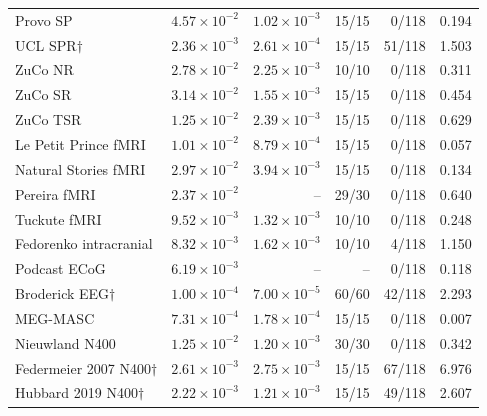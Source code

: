 {\begin{longtable}{@{}lrrrrr@{}}
Provo SP & $4.57\times10^{-2}$ & $1.02\times10^{-3}$ & 15/15 & 0/118 & 0.194 \\
UCL SPR$\dagger$ & $2.36\times10^{-3}$ & $2.61\times10^{-4}$ & 15/15 & 51/118 & 1.503 \\
ZuCo NR & $2.78\times10^{-2}$ & $2.25\times10^{-3}$ & 10/10 & 0/118 & 0.311 \\
ZuCo SR & $3.14\times10^{-2}$ & $1.55\times10^{-3}$ & 15/15 & 0/118 & 0.454 \\
ZuCo TSR & $1.25\times10^{-2}$ & $2.39\times10^{-3}$ & 15/15 & 0/118 & 0.629 \\
Le Petit Prince fMRI & $1.01\times10^{-2}$ & $8.79\times10^{-4}$ & 15/15 & 0/118 & 0.057 \\
Natural Stories fMRI & $2.97\times10^{-2}$ & $3.94\times10^{-3}$ & 15/15 & 0/118 & 0.134 \\
Pereira fMRI & $2.37\times10^{-2}$ & -- & 29/30 & 0/118 & 0.640 \\
Tuckute fMRI & $9.52\times10^{-3}$ & $1.32\times10^{-3}$ & 10/10 & 0/118 & 0.248 \\
Fedorenko intracranial & $8.32\times10^{-3}$ & $1.62\times10^{-3}$ & 10/10 & 4/118 & 1.150 \\
Podcast ECoG & $6.19\times10^{-3}$ & -- & -- & 0/118 & 0.118 \\
Broderick EEG$\dagger$ & $1.00\times10^{-4}$ & $7.00\times10^{-5}$ & 60/60 & 42/118 & 2.293 \\
MEG-MASC & $7.31\times10^{-4}$ & $1.78\times10^{-4}$ & 15/15 & 0/118 & 0.007 \\
Nieuwland N400 & $1.25\times10^{-2}$ & $1.20\times10^{-3}$ & 30/30 & 0/118 & 0.342 \\
Federmeier 2007 N400$\dagger$ & $2.61\times10^{-3}$ & $2.75\times10^{-3}$ & 15/15 & 67/118 & 6.976 \\
Hubbard 2019 N400$\dagger$ & $2.22\times10^{-3}$ & $1.21\times10^{-3}$ & 15/15 & 49/118 & 2.607 \\
\end{longtable}
}
